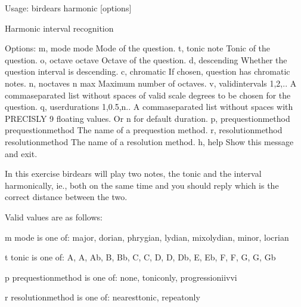 \documentclass[letterpaper,10pt,english]{sphinxmanual}
\begin{document}
%
\begin{sphinxVerbatim}[commandchars=\\\{\}]
Usage: birdears harmonic [options]

  Harmonic interval recognition

Options:
  \PYGZhy{}m, \PYGZhy{}\PYGZhy{}mode \PYGZlt{}mode\PYGZgt{}               Mode of the question.
  \PYGZhy{}t, \PYGZhy{}\PYGZhy{}tonic \PYGZlt{}note\PYGZgt{}              Tonic of the question.
  \PYGZhy{}o, \PYGZhy{}\PYGZhy{}octave \PYGZlt{}octave\PYGZgt{}           Octave of the question.
  \PYGZhy{}d, \PYGZhy{}\PYGZhy{}descending                Whether the question interval is descending.
  \PYGZhy{}c, \PYGZhy{}\PYGZhy{}chromatic                 If chosen, question has chromatic notes.
  \PYGZhy{}n, \PYGZhy{}\PYGZhy{}n\PYGZus{}octaves \PYGZlt{}n max\PYGZgt{}         Maximum number of octaves.
  \PYGZhy{}v, \PYGZhy{}\PYGZhy{}valid\PYGZus{}intervals \PYGZlt{}1,2,..\PYGZgt{}  A comma\PYGZhy{}separated list without spaces
                                  of valid scale degrees to be chosen for the
                                  question.
  \PYGZhy{}q, \PYGZhy{}\PYGZhy{}user\PYGZus{}durations \PYGZlt{}1,0.5,n..\PYGZgt{}
                                  A comma\PYGZhy{}separated list without
                                  spaces with PRECISLY 9 floating values. Or
                                  \PYGZsq{}n\PYGZsq{} for default              duration.
  \PYGZhy{}p, \PYGZhy{}\PYGZhy{}prequestion\PYGZus{}method \PYGZlt{}prequestion\PYGZus{}method\PYGZgt{}
                                  The name of a pre\PYGZhy{}question method.
  \PYGZhy{}r, \PYGZhy{}\PYGZhy{}resolution\PYGZus{}method \PYGZlt{}resolution\PYGZus{}method\PYGZgt{}
                                  The name of a resolution method.
  \PYGZhy{}h, \PYGZhy{}\PYGZhy{}help                      Show this message and exit.

  In this exercise birdears will play two notes, the tonic and the interval
  harmonically, ie., both on the same time and you should reply which is the
  correct distance between the two.

  Valid values are as follows:

  \PYGZhy{}m \PYGZlt{}mode\PYGZgt{} is one of: major, dorian, phrygian, lydian, mixolydian, minor,
  locrian

  \PYGZhy{}t \PYGZlt{}tonic\PYGZgt{} is one of: A, A\PYGZsh{}, Ab, B, Bb, C, C\PYGZsh{}, D, D\PYGZsh{}, Db, E, Eb, F, F\PYGZsh{}, G,
  G\PYGZsh{}, Gb

  \PYGZhy{}p \PYGZlt{}prequestion\PYGZus{}method\PYGZgt{} is one of: none, tonic\PYGZus{}only, progression\PYGZus{}i\PYGZus{}iv\PYGZus{}v\PYGZus{}i

  \PYGZhy{}r \PYGZlt{}resolution\PYGZus{}method\PYGZgt{} is one of: nearest\PYGZus{}tonic, repeat\PYGZus{}only
\end{sphinxVerbatim}
\end{document}
